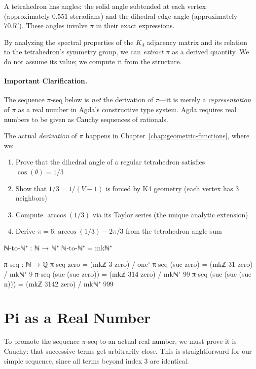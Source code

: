 \documentclass[11pt,a4paper]{book}
\def\circ{o}%
\def\cdot{.}%
\def\texorpdfstring#1#2{#2}%
\begin{document}
A tetrahedron has angles: the solid angle subtended at each vertex (approximately $0.551$ 
steradians) and the dihedral edge angle (approximately $70.5^\circ$). These angles involve 
$\pi$ in their exact expressions.

By analyzing the spectral properties of the $K_4$ adjacency matrix and its relation to the 
tetrahedron's symmetry group, we can \emph{extract} $\pi$ as a derived quantity. We do not 
assume its value; we compute it from the structure.

\paragraph{Important Clarification.}
The sequence $\pi$-seq below is \emph{not} the derivation of $\pi$—it is merely a 
\emph{representation} of $\pi$ as a real number in Agda's constructive type system.
Agda requires real numbers to be given as Cauchy sequences of rationals.

The actual \emph{derivation} of $\pi$ happens in Chapter~\ref{chap:geometric-functions}, 
where we:
\begin{enumerate}
\item Prove that the dihedral angle of a regular tetrahedron satisfies $\cos(\theta) = 1/3$
\item Show that $1/3 = 1/(V-1)$ is forced by K4 geometry (each vertex has 3 neighbors)
\item Compute $\arccos(1/3)$ via its Taylor series (the unique analytic extension)
\item Derive $\pi = 6 \cdot \arccos(1/3) - 2\pi/3$ from the tetrahedron angle sum
\end{enumerate}

\begin{code}
ℕ-to-ℕ⁺ : ℕ → ℕ⁺
ℕ-to-ℕ⁺ = mkℕ⁺

π-seq : ℕ → ℚ
π-seq zero              = (mkℤ 3 zero) / one⁺
π-seq (suc zero)        = (mkℤ 31 zero) / mkℕ⁺ 9
π-seq (suc (suc zero))  = (mkℤ 314 zero) / mkℕ⁺ 99
π-seq (suc (suc (suc n))) = (mkℤ 3142 zero) / mkℕ⁺ 999
\end{code}

\section{\texorpdfstring{$\pi$}{Pi} as a Real Number}

To promote the sequence $\pi$-seq to an actual real number, we must prove it is Cauchy: 
that successive terms get arbitrarily close. This is straightforward for our simple sequence, 
since all terms beyond index 3 are identical.
\end{document}
